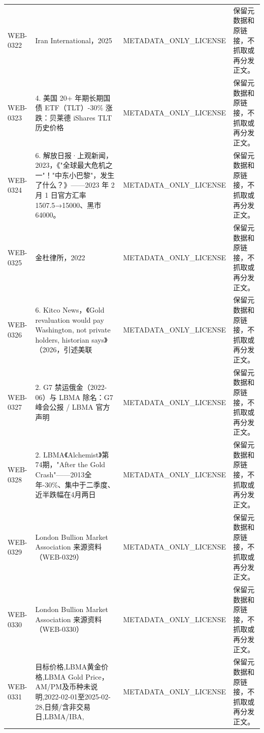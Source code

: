 \documentclass[UTF8,openany,oneside,11pt]{ctexbook}
\begin{document}
\begin{longtable}{L{1.5cm}L{5.5cm}L{3cm}L{5cm}}
WEB-\allowbreak{}0322 & Iran International，2025 & METADATA\_\allowbreak{}ONLY\_\allowbreak{}LICENSE & 保留元数据和原链接，不抓取或再分发正文。 \\
WEB-\allowbreak{}0323 & 4. 美国 20+ 年期长期国债 ETF（TLT）-\allowbreak{}30\% 涨跌：贝莱德 iShares TLT 历史价格 & METADATA\_\allowbreak{}ONLY\_\allowbreak{}LICENSE & 保留元数据和原链接，不抓取或再分发正文。 \\
WEB-\allowbreak{}0324 & 6. 解放日报·上观新闻，2023，《"全球最大危机之一"！"中东小巴黎"，发生了什么？》——2023 年 2 月 1 日官方汇率 1507.5→15000、黑市 64000。 & METADATA\_\allowbreak{}ONLY\_\allowbreak{}LICENSE & 保留元数据和原链接，不抓取或再分发正文。 \\
WEB-\allowbreak{}0325 & 金杜律所，2022 & METADATA\_\allowbreak{}ONLY\_\allowbreak{}LICENSE & 保留元数据和原链接，不抓取或再分发正文。 \\
WEB-\allowbreak{}0326 & 6. Kitco News，《Gold revaluation would pay Washington,\allowbreak{} not private holders,\allowbreak{} historian says》（2026，引述美联 & METADATA\_\allowbreak{}ONLY\_\allowbreak{}LICENSE & 保留元数据和原链接，不抓取或再分发正文。 \\
WEB-\allowbreak{}0327 & 2. G7 禁运俄金（2022-\allowbreak{}06）与 LBMA 除名：G7 峰会公报 /\allowbreak{} LBMA 官方声明 & METADATA\_\allowbreak{}ONLY\_\allowbreak{}LICENSE & 保留元数据和原链接，不抓取或再分发正文。 \\
WEB-\allowbreak{}0328 & 2. LBMA《Alchemist》第74期，"After the Gold Crash"——2013全年-\allowbreak{}30\%、集中于二季度、近半跌幅在4月两日 & METADATA\_\allowbreak{}ONLY\_\allowbreak{}LICENSE & 保留元数据和原链接，不抓取或再分发正文。 \\
WEB-\allowbreak{}0329 & London Bullion Market Association 来源资料（WEB-\allowbreak{}0329） & METADATA\_\allowbreak{}ONLY\_\allowbreak{}LICENSE & 保留元数据和原链接，不抓取或再分发正文。 \\
WEB-\allowbreak{}0330 & London Bullion Market Association 来源资料（WEB-\allowbreak{}0330） & METADATA\_\allowbreak{}ONLY\_\allowbreak{}LICENSE & 保留元数据和原链接，不抓取或再分发正文。 \\
WEB-\allowbreak{}0331 & 目标价格,\allowbreak{}LBMA黄金价格,\allowbreak{}LBMA Gold Price，AM/\allowbreak{}PM及币种未说明,\allowbreak{}2022-\allowbreak{}02-\allowbreak{}01至2025-\allowbreak{}02-\allowbreak{}28,\allowbreak{}日频/\allowbreak{}含非交易日,\allowbreak{}LBMA/\allowbreak{}IBA,\allowbreak{} & METADATA\_\allowbreak{}ONLY\_\allowbreak{}LICENSE & 保留元数据和原链接，不抓取或再分发正文。 \\

\end{longtable}
\end{document}
